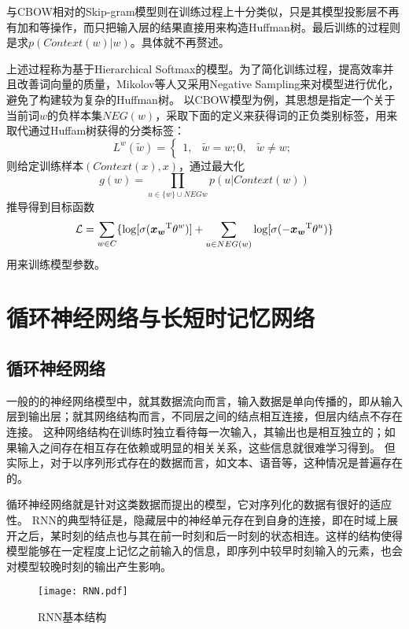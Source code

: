 与CBOW相对的Skip-gram模型则在训练过程上十分类似，只是其模型投影层不再有加和等操作，而只把输入层的结果直接用来构造Huffman树。最后训练的过程则是求$p(Context(w)|w)$。具体就不再赘述。

上述过程称为基于Hierarchical Softmax的模型。为了简化训练过程，提高效率并且改善词向量的质量，Mikolov等人又采用Negative Sampling来对模型进行优化，避免了构建较为复杂的Huffman树。
以CBOW模型为例，其思想是指定一个关于当前词$w$的负样本集$NEG(w)$，采取下面的定义来获得词的正负类别标签，用来取代通过Huffam树获得的分类标签：
\begin{equation}
    L^w(\tilde{w}) = \left\{
        \begin{aligned}
            1, &\tilde{w} = w;
            0, &\tilde{w} \neq w;
        \end{aligned}
    \right.
\end{equation}
则给定训练样本$(Context(x), x)$，通过最大化
\begin{equation}
    g(w) = \prod_{u\in\{w\}\cup NEG{w}}p(u|Context(w))
\end{equation}
推导得到目标函数
\begin{equation}
    \mathcal{L} = \sum_{w\in C}\{\log[\sigma(\boldsymbol{x_w}^\mathrm{T}\theta^w)] + \sum_{u\in NEG(w)}\log[\sigma(-\boldsymbol{x_w}^\mathrm{T}\theta^u)\}
\end{equation}
用来训练模型参数。

\section{循环神经网络与长短时记忆网络}
\subsection{循环神经网络}
一般的的神经网络模型中，就其数据流向而言，输入数据是单向传播的，即从输入层到输出层；就其网络结构而言，不同层之间的结点相互连接，但层内结点不存在连接。
这种网络结构在训练时独立看待每一次输入，其输出也是相互独立的；如果输入之间存在相互存在依赖或明显的相关关系，这些信息就很难学习得到。
但实际上，对于以序列形式存在的数据而言，如文本、语音等，这种情况是普遍存在的。

循环神经网络就是针对这类数据而提出的模型，它对序列化的数据有很好的适应性。
RNN的典型特征是，隐藏层中的神经单元存在到自身的连接，即在时域上展开之后，某时刻的结点也与其在前一时刻和后一时刻的状态相连。这样的结构使得模型能够在一定程度上记忆之前输入的信息，即序列中较早时刻输入的元素，也会对模型较晚时刻的输出产生影响。

\begin{figure}[!htpb]
    \centering
    \texttt{[image: RNN.pdf]}
    \caption{RNN基本结构}
    \label{fig:RNN}
\end{figure}

